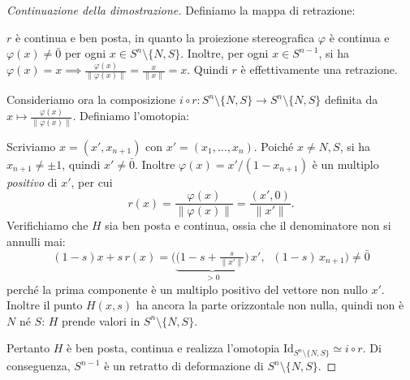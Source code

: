 \begin{proof}[Continuazione della dimostrazione]
Definiamo la mappa di retrazione:

$r$ è continua e ben posta, in quanto la proiezione stereografica $\varphi$ è continua e $\varphi(x) \neq \bar{0}$ per ogni $x \in S^n \setminus \{N,S\}$.
Inoltre, per ogni $x \in S^{n-1}$, si ha $\varphi(x) = x \implies \frac{\varphi(x)}{\|\varphi(x)\|} = \frac{x}{\|x\|} = x$. Quindi $r$ è effettivamente una retrazione.


Consideriamo ora la composizione $i \circ r: S^n \setminus \{N,S\} \to S^n \setminus \{N,S\}$ definita da $x \mapsto \frac{\varphi(x)}{\|\varphi(x)\|}$. Definiamo l'omotopia:

Scriviamo $x = (x', x_{n+1})$ con $x' = (x_1, \dots, x_n)$. Poich\'e $x \neq N, S$, si ha $x_{n+1} \neq \pm 1$, quindi $x' \neq \bar{0}$. Inoltre $\varphi(x) = x'/(1 - x_{n+1})$ \`e un multiplo \emph{positivo} di $x'$, per cui
\[
r(x) = \frac{\varphi(x)}{\|\varphi(x)\|} = \frac{(x', 0)}{\|x'\|} .
\]
Verifichiamo che $H$ sia ben posta e continua, ossia che il denominatore non si annulli mai:
\[
(1-s)x + s\,r(x) = \Big( \underbrace{\big(1-s + \tfrac{s}{\|x'\|}\big)}_{>0}\, x',\;\; (1-s)\,x_{n+1} \Big) \neq \bar{0}
\]
perch\'e la prima componente \`e un multiplo positivo del vettore non nullo $x'$. Inoltre il punto $H(x,s)$ ha ancora la parte orizzontale non nulla, quindi non \`e $N$ n\'e $S$: $H$ prende valori in $S^n \setminus \{N,S\}$.

Pertanto $H$ è ben posta, continua e realizza l'omotopia $\mathrm{Id}_{S^n \setminus \{N,S\}} \simeq i \circ r$. Di conseguenza, $S^{n-1}$ è un retratto di deformazione di $S^n \setminus \{N,S\}$.
\end{proof}

\vspace{1.5em}

